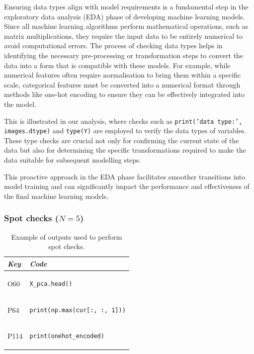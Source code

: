 Ensuring data types align with model requirements is a fundamental step in the exploratory data analysis (EDA) phase of developing machine learning models. Since all machine learning algorithms perform mathematical operations, such as matrix multiplications, they require the input data to be entirely numerical to avoid computational errors. The process of checking data types helps in identifying the necessary pre-processing or transformation steps to convert the data into a form that is compatible with these models. For example, while numerical features often require normalisation to bring them within a specific scale, categorical features must be converted into a numerical format through methods like one-hot encoding to ensure they can be effectively integrated into the model.

This is illustrated in our analysis, where checks such as \texttt{print('data type:', images.dtype)} and \texttt{type(Y)} are employed to verify the data types of variables. These type checks are crucial not only for confirming the current state of the data but also for determining the specific transformations required to make the data suitable for subsequent modelling steps.

This proactive approach in the EDA phase facilitates smoother transitions into model training and can significantly impact the performance and effectiveness of the final machine learning models.

\subsubsection{Spot checks ($N = 5$)}

\begin{table}
\centering
\begin{tabular}{@{}m{} m{}@{}}
\toprule
\emph{\textbf{Key}}&
\emph{\textbf{Code}}\\
\midrule

O60 &
\begin{lstlisting}
X_pca.head()
\end{lstlisting}\\

P64 &
\begin{lstlisting}
print(np.max(cur[:, :, 1]))
\end{lstlisting}\\

P114 &
\begin{lstlisting}
print(onehot_encoded)
\end{lstlisting}\\
\end{tabular}
\caption{Example of outputs used to perform spot checks.}
\label{tab:spot-check}
\end{table}

